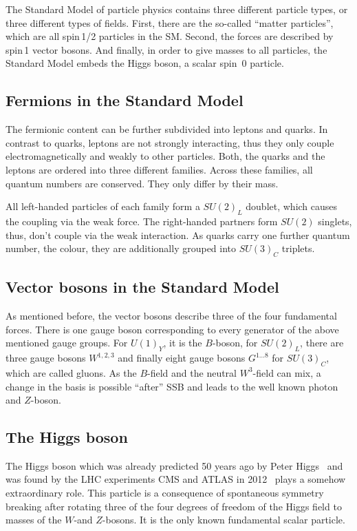 The Standard Model of particle physics contains three different particle types, or three different types of fields.
First, there are the so-called ``matter particles'', which are all spin\,1/2 particles in the SM.
Second, the forces are described by spin\,1 vector bosons.
And finally, in order to give masses to all particles, the Standard Model embeds the Higgs boson, a scalar spin~0 particle.

\subsection*{Fermions in the Standard Model}
The fermionic content can be further subdivided into leptons and quarks.
In contrast to quarks, leptons are not strongly interacting, thus they only couple electromagnetically and weakly to other particles.
Both, the quarks and the leptons are ordered into three different families.
Across these families, all quantum numbers are conserved.
They only differ by their mass.

All left-handed particles of each family form a $SU(2)_L$ doublet, which causes the coupling via the weak force.
The right-handed partners form $SU(2)$ singlets, thus, don't couple via the weak interaction.
As quarks carry one further quantum number, the colour, they are additionally grouped into $SU(3)_C$ triplets.

\subsection*{Vector bosons in the Standard Model}
As mentioned before, the vector bosons describe three of the four fundamental forces.
There is one gauge boson corresponding to every generator of the above mentioned gauge groups.
For $U(1)_Y$, it is the $B$-boson, for $SU(2)_L$, there are three gauge bosons $W^{1,2,3}$ and finally eight gauge bosons $G^{1...8}$ for $SU(3)_C$, which are called gluons.
As the $B$-field and the neutral $W^3$-field can mix, a change in the basis is possible ``after'' SSB and leads to the well known photon and $Z$-boson.

\subsection*{The Higgs boson}
The Higgs boson which was already predicted 50 years ago by Peter Higgs~\cite{bib:Higgs_Prediction,bib:Higgs_Prediction_2} and was found by the LHC experiments CMS and ATLAS in 2012~\cite{bib:Theory:CMS:HiggsObservation,bib:Theory:Atlas:HiggsObservation} plays a somehow extraordinary role.
This particle is a consequence of spontaneous symmetry breaking after rotating three of the four degrees of freedom of the Higgs field to masses of the $W$-and $Z$-bosons.
It is the only known fundamental scalar particle.\\


